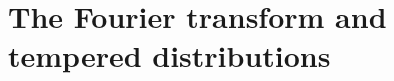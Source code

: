 \documentclass[article, a4paper, 11pt, oneside]{memoir}
\makeatletter
\let\phi\varphi
\numberwithin{equation}{chapter}
\theoremstyle{myexample}
\theoremstyle{myexample}
\theoremstyle{myexamplebreak}
\theoremstyle{myexamplebreak}
\theoremstyle{nonumberplain}
\newtheorem{proof}{\protect\@proof}
\theoremstyle{MyNonumberplain}
\newcommand{\@proof}{}
\renewcommand{\@proof}{Proof}%
\renewcommand{\@proof}{Bevis}%
\makeatother
\begin{document}






\chapter{The Fourier transform and tempered distributions}
\label{sec:fourier_distributions}

\newcommand{\loc}{\mathrm{loc}}
\newcommand{\testfunc}{\mathcal{D}}
\newcommand{\distr}{\mathcal{D}'}
\newcommand{\schwartz}{\mathcal{S}}
\newcommand{\calO}{\mathcal{O}}
\end{document}
